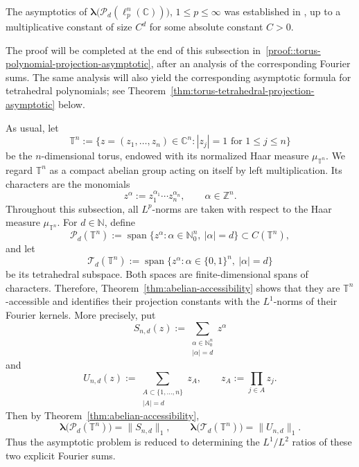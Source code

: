 \documentclass[11pt,showkeys]{amsart}
\begin{document}
The asymptotics of \(\boldsymbol\lambda\bigl(\mathcal P_d(\ell_p^n(\mathbb C))\bigr)\), \(1\le p\le\infty\) was established in \cite{defant2011bohr}, up to a multiplicative constant of size 
\(C^d\)
 for some absolute constant 
\(C>0\).


The proof will be completed at the end of this subsection in~\ref{proof::torus-polynomial-projection-asymptotic}, after an analysis
of the corresponding Fourier sums.
The same analysis will also yield the corresponding asymptotic formula
for tetrahedral polynomials; see
Theorem~\ref{thm:torus-tetrahedral-projection-asymptotic} below.


As usual, let
\[
    \mathbb T^n
    :=
    \bigl\{
        z=(z_1,\ldots,z_n)\in\mathbb C^n:
        |z_j|=1 \text{ for }1\le j\le n
    \bigr\}
\]
be the \(n\)-dimensional torus, endowed with its normalized Haar measure
\(\mu_{\mathbb T^n}\). We regard \(\mathbb T^n\) as a compact abelian group acting on
itself by left multiplication. Its characters are the monomials
\[
    z^\alpha
    :=
    z_1^{\alpha_1}\cdots z_n^{\alpha_n},
    \qquad
    \alpha\in\mathbb Z^n.
\]
Throughout this subsection, all \(L^p\)-norms are taken with respect to
the Haar measure \(\mu_{\mathbb T^n}\).
For \(d\in\mathbb N\), define
\[
    \mathcal P_d(\mathbb T^n)
    :=
    \operatorname{span}
    \bigl\{
        z^\alpha:
        \alpha\in\mathbb N_0^n,\ |\alpha|=d
    \bigr\} \subset C(\mathbb T^n),
\]
and let
\[
    \mathcal T_d(\mathbb T^n)
    :=
    \operatorname{span}
    \bigl\{
        z^\alpha:
        \alpha\in\{0,1\}^n,\ |\alpha|=d
    \bigr\}
\]
be its tetrahedral subspace.
Both spaces are finite-dimensional spans of characters. Therefore,
Theorem~\ref{thm:abelian-accessibility} shows that they are
\(\mathbb T^n\)-accessible and identifies their projection constants with
the \(L^1\)-norms of their Fourier kernels. More precisely, put
\[
    S_{n,d}(z)
    :=
    \sum_{\substack{\alpha\in\mathbb N_0^n\\|\alpha|=d}}
    z^\alpha
\]
and
\[
    U_{n,d}(z)
    :=
    \sum_{\substack{A\subset\{1,\ldots,n\}\\|A|=d}}
    z_A,
    \qquad
    z_A:=\prod_{j\in A}z_j.
\]
Then by Theorem~\ref{thm:abelian-accessibility}, 
\begin{equation}
\label{eq:torus-projection-kernels}
    \boldsymbol\lambda\bigl(\mathcal P_d(\mathbb T^n)\bigr)
    =
    \|S_{n,d}\|_1,
    \qquad
    \boldsymbol\lambda\bigl(\mathcal T_d(\mathbb T^n)\bigr)
    =
    \|U_{n,d}\|_1.
\end{equation}
Thus the asymptotic problem is reduced to determining the \(L^1/L^2\)
ratios of these two explicit Fourier sums.
\end{document}
